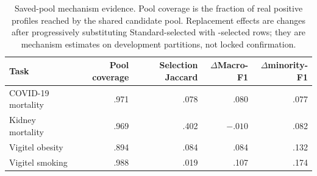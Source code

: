 \begin{table}[htbp]
\centering
\caption{Saved-pool mechanism evidence. Pool coverage is the fraction of real positive profiles reached by the shared candidate pool. Replacement effects are changes after progressively substituting Standard-selected with \sepa{}-selected rows; they are mechanism estimates on development partitions, not locked confirmation.}
\label{tab:mechanism}
\small
\begin{tabularx}{\textwidth}{Xrrrr}
\toprule
Task & Pool coverage & Selection Jaccard & $\Delta$Macro-F1 & $\Delta$minority-F1\\
\midrule
COVID-19 mortality & .971 & .078 & .080 & .077\\
Kidney mortality & .969 & .402 & $-.010$ & .082\\
Vigitel obesity & .894 & .084 & .084 & .132\\
Vigitel smoking & .988 & .019 & .107 & .174\\
\bottomrule
\end{tabularx}
\end{table}
